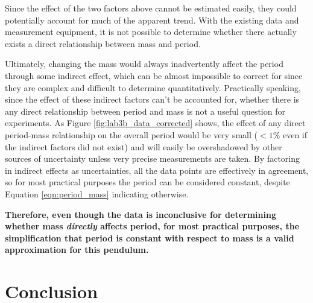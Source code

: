 \documentclass[aps,twocolumn,secnumarabic,nobalancelastpage,amsmath,amssymb,nofootinbib,floatfix,letterpaper]{revtex4}
\begin{document}
Since the effect of the two factors above cannot be estimated easily, they could potentially account for much of the
apparent trend. With the existing data and measurement equipment, it is not possible to determine whether there actually
exists a direct relationship between mass and period.

Ultimately, changing the mass would always inadvertently affect the period through some indirect effect, which can be
almost impossible to correct for since they are complex and difficult to determine quantitatively.
Practically speaking, since the effect of these indirect factors can't be accounted for, whether there is any direct
relationship between period and mass is not a useful question for experiments. As Figure \ref{fig:lab3b_data_corrected}
shows, the effect of any direct period-mass relationship on the overall period would be very small (\(< 1\%\)
even if the indirect factors did not exist) and will easily be overshadowed by other sources of uncertainty unless very
precise measurements are taken. By factoring in indirect effects as uncertainties, all the data points are effectively
in agreement, so for most practical purposes the period can be considered constant, despite Equation \ref{eqn:period_mass}
indicating otherwise.

\textbf{Therefore, even though the data is inconclusive for determining whether mass \textit{directly} affects period,
for most practical purposes, the simplification that period is constant with respect to mass is a valid approximation
for this pendulum.}


\section{Conclusion}
\end{document}
